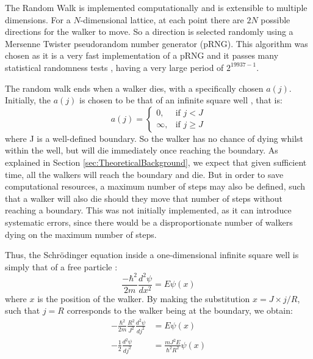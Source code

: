 \documentclass[journal]{IEEEtran}
\begin{document}
The Random Walk is implemented computationally  and is extensible
to multiple dimensions. For a $N$-dimensional lattice, at each point there are
$2N$ possible directions for the walker to move. So a direction is selected
randomly using a Mersenne Twister pseudorandom number generator (pRNG). This algorithm
was chosen as it is a very fast implementation of a pRNG  and it
passes many statistical randomness tests , having a very large
period of $2^{19937-1}$.

The random walk ends when a walker dies, with a
specifically chosen $a(j)$. Initially, the $a(j)$ is chosen to be that of an
infinite square well , that is:
\begin{equation}
  \label{eq:squarewell}
    a(j) =
    \begin{cases}
      0,& \text{if } j < J\\
      \infty,& \text{if } j \geq J
    \end{cases}
    \nonumber
\end{equation}
where J is a well-defined boundary. So the walker has no chance of dying whilst
within the well, but will die immediately once reaching the boundary. As
explained in Section \ref{sec:TheoreticalBackground}, we expect that given
sufficient time, all the walkers will reach the boundary and die. But in order
to save computational resources, a maximum number of steps may also be defined,
such that a walker will also die should they move that number of steps without
reaching a boundary. This was not initially implemented, as it can introduce
systematic errors, since there would be a disproportionate number of walkers dying
on the maximum number of steps.

Thus, the Schr\"{o}dinger equation inside a one-dimensional infinite square well
is simply that of a free particle :
\begin{equation}
  \frac{-\hbar^2}{2m}\frac{d^2 \psi}{dx^2} = E\psi(x)
  \nonumber
\end{equation}
where $x$ is the position of the walker. By making the substitution $x = J
\times j/R$, such that $j=R$ corresponds to the walker being at the boundary, we
obtain:
\begin{equation}
  \begin{split}
    -\frac{\hbar^2}{2m}\frac{R^2}{J^2}\frac{d^2\psi}{dj^2} &= E\psi(x)\\
    -\frac{1}{2}\frac{d^2\psi}{dj^2} &= \frac{mJ^2E}{\hbar^2R^2}\psi(x)
  \end{split}
  \nonumber
\end{equation}
\end{document}
